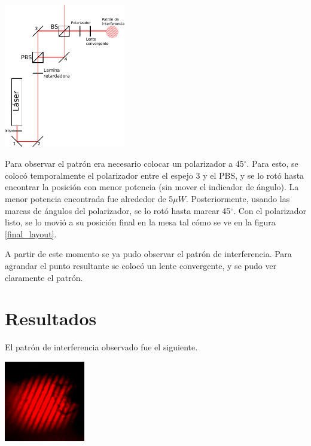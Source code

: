 \documentclass[twocolumn]{article}
\begin{document}
		\begin{center}
			\includegraphics[width=150pt]{img/layout.pdf}
			\label{final_layout}
		\end{center}

		Para observar el patrón era necesario colocar un polarizador a 45$^{\circ}$. Para esto, se colocó temporalmente el polarizador entre el espejo 3 y el PBS, y se lo rotó hasta encontrar la posición con menor potencia (sin mover el indicador de ángulo). La menor potencia encontrada fue alrededor de 5$\mu W$. Posteriormente, usando las marcas de ángulos del polarizador, se lo rotó hasta marcar 45$^{\circ}$. Con el polarizador listo, se lo movió a su posición final en la mesa tal cómo se ve en la figura \ref{final_layout}.

		A partir de este momento se ya pudo observar el patrón de interferencia. Para agrandar el punto resultante se colocó un lente convergente, y se pudo ver claramente el patrón.

	\section{Resultados}
		El patrón de interferencia observado fue el siguiente.

		\begin{center}
			\includegraphics[width=100pt]{img/interference.png}
			\label{interference}
		\end{center}
\end{document}

